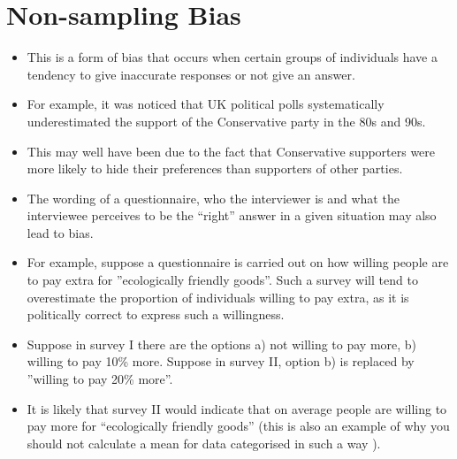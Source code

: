 \documentclass[a4paper,12pt]{article}
\begin{document}
\section{Non-sampling Bias}
\begin{itemize}
\item This is a form of bias that occurs when certain groups of
individuals have a tendency to give inaccurate responses or not
give an answer.
\item For example, it was noticed that UK political polls systematically
underestimated the support of the Conservative party in the 80s
and 90s.
\item This may well have been due to the fact that Conservative
supporters were more likely to hide their preferences than
supporters of other parties.
\end{itemize}


\begin{itemize}
\item The wording of a questionnaire, who the interviewer is and what
the interviewee perceives to be the ``right” answer in a given
situation may also lead to bias.
\item For example, suppose a questionnaire is carried out on how willing people are to pay extra for ”ecologically friendly goods”.
Such a survey will tend to overestimate the proportion of individuals willing to pay extra, as it is politically correct to express
such a willingness.
\item Suppose in survey I there are the options a) not willing to pay more, b) willing to pay 10\% more. Suppose in survey II, option b)
is replaced by ”willing to pay 20\% more”. \item It is likely that survey II
would indicate that on average people are willing to pay more for ``ecologically friendly goods” (this is also an example of why you
should not calculate a mean for data categorised in such a way ).
\end{itemize}

\end{document}
